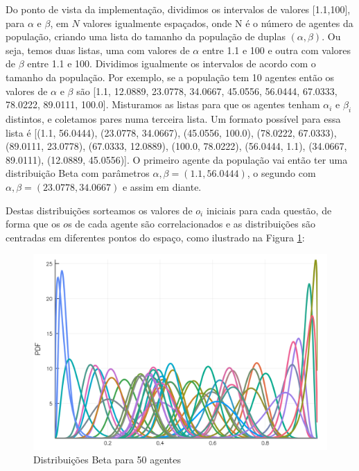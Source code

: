 Do ponto de vista da implementação, dividimos os intervalos de valores
[1.1,100], para \(\alpha\) e \(\beta\), em \(N\) valores igualmente espaçados, onde N é o
número de agentes da população, criando uma lista do tamanho da população de
duplas \((\alpha,\beta)\). Ou seja, temos duas listas, uma com valores de \(\alpha\) entre 1.1
e 100 e outra com valores de \(\beta\) entre 1.1 e 100. Dividimos igualmente os
intervalos de acordo com o tamanho da população. Por exemplo, se a população tem
10 agentes então os valores de \(\alpha\) e \(\beta\) são [1.1, 12.0889, 23.0778,
34.0667, 45.0556, 56.0444, 67.0333, 78.0222, 89.0111, 100.0]. Misturamos as
listas para que os agentes tenham \(\alpha_i\) e \(\beta_i\) distintos, e coletamos pares
numa terceira lista. Um formato possível para essa lista é [(1.1, 56.0444),
(23.0778, 34.0667), (45.0556, 100.0), (78.0222, 67.0333), (89.0111, 23.0778),
(67.0333, 12.0889), (100.0, 78.0222), (56.0444, 1.1), (34.0667, 89.0111),
(12.0889, 45.0556)]. O primeiro agente da população vai então ter uma
distribuição Beta com parâmetros \(\alpha, \beta = (1.1, 56.0444) \), o segundo com
\(\alpha,\beta=(23.0778,34.0667)\) e assim em diante.

Destas distribuições sorteamos os valores de \(o_i\) iniciais para cada questão,
de forma que os \(o\)s de cada agente são correlacionados e as distribuições são
centradas em diferentes pontos do espaço, como ilustrado na Figura
\ref{fig:betas100}:

\begin{figure}[H]
  \centering
  \includegraphics[width=\textwidth]{ims/beta100.png}
  \caption{Distribuições Beta para 50 agentes}
  \label{fig:betas100}
\end{figure}


